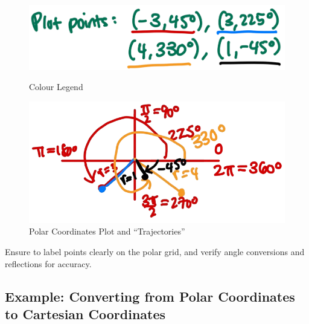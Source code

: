 \documentclass{article}
\begin{document}
\begin{examplebox}
\begin{solutionbox}
    \begin{figure}[H]
        \centering
        \begin{minipage}{0.3\textwidth}
            \centering
            \includegraphics[width=\textwidth]{plot points.png}
            \caption{Colour Legend}
            \label{fig:image1}
        \end{minipage}%
        \hspace{0.04\textwidth} %
        \begin{minipage}{0.65\textwidth}
            \centering
            \includegraphics[width=\textwidth]{plot points example.png}
            \caption{Polar Coordinates Plot and ``Trajectories''}
            \label{fig:image2}
        \end{minipage}
    \end{figure}    
\end{solutionbox}
\end{examplebox}

\begin{tipbox}
    Ensure to label points clearly on the polar grid, and verify angle conversions and reflections for accuracy.
\end{tipbox}

\subsection*{Example: Converting from Polar Coordinates to Cartesian Coordinates}
\end{document}
